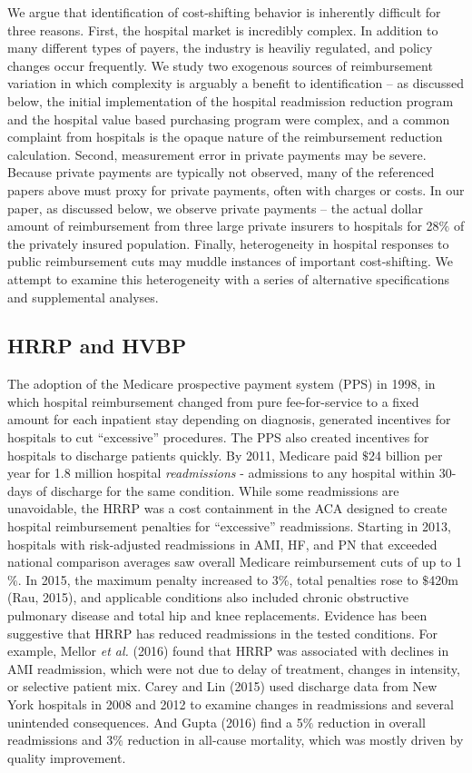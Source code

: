 \documentclass[12pt]{article}
\begin{document}
We argue that identification of cost-shifting behavior is inherently difficult for three reasons.  First, the hospital market is incredibly complex.  In addition to many different types of payers, the industry is heaviliy regulated, and policy changes occur frequently.  We study two exogenous sources of reimbursement variation in which complexity is arguably a benefit to identification -- as discussed below, the initial implementation of the hospital readmission reduction program and the hospital value based purchasing program were complex, and a common complaint from hospitals is the opaque nature of the reimbursement reduction calculation.  Second, measurement error in private payments may be severe.  Because private payments are typically not observed, many of the referenced papers above must proxy for private payments, often with charges or costs.  In our paper, as discussed below, we observe private payments -- the actual dollar amount of reimbursement from three large private insurers to hospitals for 28$\%$ of the privately insured population.  Finally, heterogeneity in hospital responses to public reimbursement cuts may muddle instances of important cost-shifting. We attempt to examine this heterogeneity with a series of alternative specifications and supplemental analyses.

\subsection{HRRP and HVBP}
The adoption of the Medicare prospective payment system (PPS) in 1998, in which hospital reimbursement changed from pure fee-for-service to a fixed amount for each inpatient stay depending on diagnosis, generated incentives for hospitals to cut ``excessive'' procedures. The PPS also created incentives for hospitals to discharge patients quickly.  By 2011, Medicare paid $\$$24 billion per year for 1.8 million hospital \textit{readmissions} - admissions to any hospital within 30-days of discharge for the same condition.  While some readmissions are unavoidable, the HRRP was a cost containment in the ACA designed to create hospital reimbursement penalties for ``excessive'' readmissions.  Starting in 2013, hospitals with risk-adjusted readmissions in AMI, HF, and PN that exceeded national comparison averages saw overall Medicare reimbursement cuts of up to 1$\%$.   In 2015, the maximum penalty increased to 3$\%$, total penalties rose to $\$$420m (Rau, 2015), and applicable conditions also included chronic obstructive pulmonary disease and total hip and knee replacements.  Evidence has been suggestive that HRRP has reduced readmissions in the tested conditions.  For example, Mellor \textit{et al.} (2016) found that HRRP was associated with declines in AMI readmission, which were not due to delay of treatment, changes in intensity, or selective patient mix. Carey and Lin (2015) used discharge data from New York hospitals in 2008 and 2012 to examine changes in readmissions and several unintended consequences. And Gupta (2016) find a 5$\%$ reduction in overall readmissions and 3$\%$ reduction in all-cause mortality, which was mostly driven by quality improvement.
\end{document}
